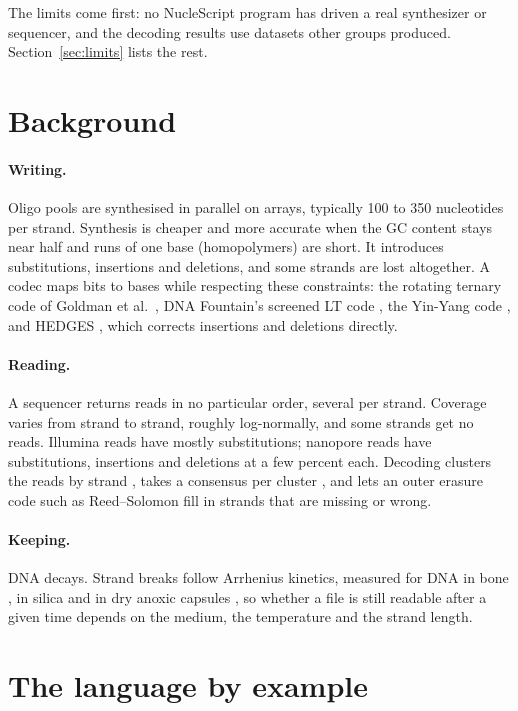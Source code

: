 \documentclass[11pt,a4paper]{article}
\begin{document}
The limits come first: no NucleScript program has driven a real
synthesizer or sequencer, and the decoding results use datasets other
groups produced. Section~\ref{sec:limits} lists the rest.

\section{Background}
\label{sec:background}

\paragraph{Writing.} Oligo pools are synthesised in parallel on arrays,
typically 100 to 350 nucleotides per strand. Synthesis is cheaper and
more accurate when the GC content stays near half and runs of one base
(homopolymers) are short. It introduces substitutions, insertions and
deletions, and some strands are lost altogether. A codec maps bits to
bases while respecting these constraints: the rotating ternary code of
Goldman et al.~\cite{goldman2013}, DNA Fountain's screened LT code
\cite{erlich2017}, the Yin-Yang code \cite{yinyang}, and HEDGES
\cite{hedges}, which corrects insertions and deletions directly.

\paragraph{Reading.} A sequencer returns reads in no particular order,
several per strand. Coverage varies from strand to strand, roughly
log-normally, and some strands get no reads. Illumina reads have mostly
substitutions; nanopore reads have substitutions, insertions and
deletions at a few percent each. Decoding clusters the reads by strand
\cite{rashtchian2017}, takes a consensus per cluster
\cite{trellisbma}, and lets an outer erasure code such as Reed--Solomon
fill in strands that are missing or wrong.

\paragraph{Keeping.} DNA decays. Strand breaks follow Arrhenius kinetics,
measured for DNA in bone \cite{allentoft2012}, in silica
\cite{grass2015} and in dry anoxic capsules \cite{coudy2021}, so whether
a file is still readable after a given time depends on the medium, the
temperature and the strand length.

\section{The language by example}
\label{sec:lang}
\end{document}
